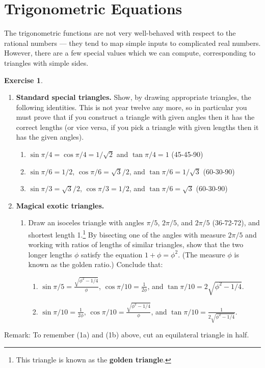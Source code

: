 \documentclass[a4paper,leqno]{article}
\numberwithin{equation}{section}
\theoremstyle{definition}
\newtheorem{exercise}[equation]{Exercise}
\theoremstyle{remark}
\newcommand{\df}[1]{\textbf{#1}}
\begin{document}
\section{Trigonometric Equations}
The trigonometric functions are not very well-behaved with respect to the rational numbers --- they tend to map
simple inputs to complicated real numbers. However, there are a few special values which we can compute, corresponding
to triangles with simple sides.
\begin{exercise}\leavevmode\label{ex:specialtriangles}
  \begin{enumerate}
    \item \textbf{Standard special triangles.} Show, by drawing appropriate triangles, the following identities. This is not year twelve any more,
                                               so in particular you must prove that if you construct a triangle with given angles then it has the
                                               correct lengths (or vice versa, if you pick a triangle with given lengths then it has the given angles).
      \begin{enumerate}
        \item $ \sin \pi/4 = \cos \pi/4 = 1/\sqrt{2} $ and $ \tan \pi/4 = 1 $ (45-45-90)
        \item $ \sin \pi/6 = 1/2 $, $ \cos \pi/6 = \sqrt{3}/2 $, and $ \tan \pi/6 = 1/\sqrt{3} $ (60-30-90)
        \item $ \sin \pi/3 = \sqrt{3}/2 $, $ \cos \pi/3 = 1/2 $, and $ \tan \pi/6 = \sqrt{3} $ (60-30-90)
      \end{enumerate}
    \item \textbf{Magical exotic triangles.}
      \begin{enumerate}
        \item Draw an isoceles triangle with angles $ \pi/5 $, $ 2\pi/5 $, and $ 2\pi/5 $ (36-72-72), and shortest length 1.\footnote{This
              triangle is known as the \df{golden triangle}.} By bisecting one of the angles with measure $ 2\pi/5 $ and working with ratios
              of lengths of similar triangles, show that the two longer lengths $ \phi $ satisfy the equation $ 1 + \phi = \phi^2 $. (The
              measure $ \phi $ is known as the golden ratio.) Conclude that:
              \begin{enumerate}
                \item $ \sin \pi/5 = \frac{\sqrt{\phi^2 - 1/4}}{\phi} $, $ \cos \pi/10 = \frac{1}{2\phi} $, and $ \tan \pi/10 = 2\sqrt{\phi^2 - 1/4} $.
                \item $ \sin \pi/10 = \frac{1}{2\phi} $, $ \cos \pi/10 = \frac{\sqrt{\phi^2 - 1/4}}{\phi} $, and $ \tan \pi/10 = \frac{1}{2\sqrt{\phi^2 - 1/4}} $.
              \end{enumerate}
      \end{enumerate}
  \end{enumerate}
  Remark: To remember (1a) and (1b) above, cut an equilateral triangle in half.
\end{exercise}
\end{document}
